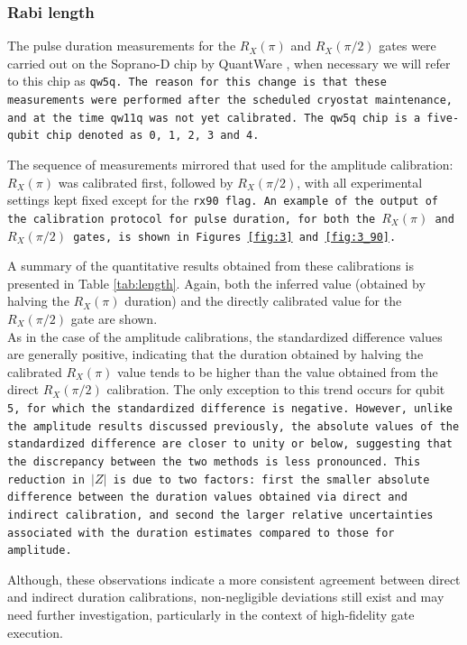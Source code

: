 \subsubsection{Rabi length}
The pulse duration measurements for the $R_X(\pi)$ and $R_X(\pi/2)$ gates were carried out on the Soprano-D chip by QuantWare \cite{qw5q}, when necessary we will refer to this chip as \tt{qw5q}.
The reason for this change is that these measurements were performed after the scheduled cryostat maintenance, and at the time \tt{qw11q} was not yet calibrated.
The \tt{qw5q} chip is a five-qubit chip denoted as \tt{0}, \tt{1}, \tt{2}, \tt{3} and \tt{4}.

The sequence of measurements mirrored that used for the amplitude calibration: $R_X(\pi)$ was calibrated first, followed by $R_X(\pi/2)$, with all experimental settings kept fixed except for the \tt{rx90} flag.
An example of the output of the calibration protocol for pulse duration, for both the $R_X(\pi)$ and $R_X(\pi/2)$ gates, is shown in Figures \ref{fig:3} and \ref{fig:3_90}. 

A summary of the quantitative results obtained from these calibrations is presented in Table \ref{tab:length}.
Again, both the inferred value (obtained by halving the $R_X(\pi)$ duration) and the directly calibrated value for the $R_X(\pi/2)$ gate are shown.\\
As in the case of the amplitude calibrations, the standardized difference values are generally positive, indicating that the duration obtained by halving the calibrated $R_X(\pi)$ value tends to be higher than the value obtained from the direct $R_X(\pi/2)$ calibration. 
The only exception to this trend occurs for qubit \tt{5}, for which the standardized difference is negative.
However, unlike the amplitude results discussed previously, the absolute values of the standardized difference are closer to unity or below, suggesting that the discrepancy between the two methods is less pronounced.
This reduction in $|Z|$ is due to two factors: first the smaller absolute difference between the duration values obtained via direct and indirect calibration, and second the larger relative uncertainties associated with the duration estimates compared to those for amplitude.

Although, these observations indicate a more consistent agreement between direct and indirect duration calibrations, non-negligible deviations still exist and may need further investigation, particularly in the context of high-fidelity gate execution.

